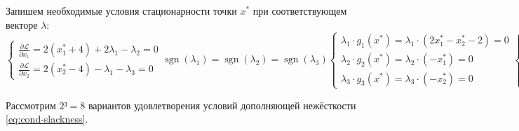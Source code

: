 \documentclass{article}
\renewcommand{\leq}{\leqslant}
\providecommand{\La}{\mathcal{L}}
\providecommand{\pardiff}[2]{\frac{\partial{#1}}{\partial{#2}}}
\DeclareMathOperator{\sgn}{sgn}
\numberwithin{equation}{section}
\begin{document}
Запишем необходимые условия стационарности точки $x^*$ при
соответствующем векторе $\lambda$:
\begin{subequations}
  \renewcommand{\theequation}{\theparentequation\asbuk{equation}}
  \label{eq:kkt-conditions}
  \begin{equation}
    \label{eq:cond-stationary}
    \begin{cases}
      \pardiff{\La}{x_1} = 2(x^*_1+4)+2\lambda_1-\lambda_2=0\\
      \pardiff{\La}{x_2} = 2(x^*_2-4)-\lambda_1-\lambda_3=0
    \end{cases}
  \end{equation}
  \begin{equation}
    \label{eq:cond-sign}
    \sgn(\lambda_1) = \sgn(\lambda_2) = \sgn(\lambda_3)
  \end{equation}
  \begin{equation}
    \label{eq:cond-slackness}
    \begin{cases}
      \lambda_1\cdot g_1(x^*) = \lambda_1\cdot (2x^*_1-x^*_2-2) = 0\\
      \lambda_2\cdot g_2(x^*) = \lambda_2\cdot (-x^*_1) = 0\\
      \lambda_3\cdot g_3(x^*) = \lambda_3\cdot (-x^*_2) = 0
    \end{cases}
  \end{equation}
  \begin{equation}
    \begin{cases}
      \label{eq:cond-feasible}
      g_1(x^*) = 2x^*_1 - x^*_2 - 2 \leq 0 \\
      g_2(x^*) = -x^*_1 \leq 0 \\
      g_3(x^*) = -x^*_2 \leq 0
    \end{cases}
  \end{equation}
\end{subequations}

Рассмотрим $2³=8$ вариантов удовлетворения условий дополняющей
нежёсткости \eqref{eq:cond-slackness}.
\end{document}
